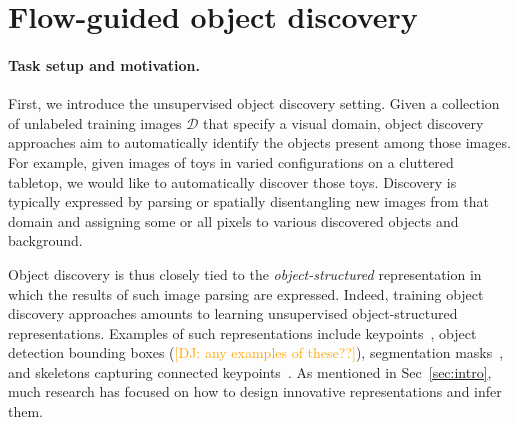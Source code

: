 \documentclass{article}
\newcommand{\jd}[1]{\textcolor{orange}{[DJ: #1]}}
\begin{document}











\section{Flow-guided object discovery}
\label{sec:approach}

\paragraph{Task setup and motivation.} First, we introduce the unsupervised object discovery setting. Given a collection of unlabeled training images $\mathcal{D}$ that specify a visual domain, object discovery approaches aim to automatically identify the objects present among those images. For example, given images of toys in varied configurations on a cluttered tabletop, we would like to automatically discover those toys. Discovery is typically expressed by parsing or spatially disentangling new images from that domain and assigning some or all pixels to various discovered objects and background.

Object discovery is thus closely tied to the \emph{object-structured} representation in which the results of such image parsing are expressed. Indeed, training object discovery approaches amounts to learning unsupervised object-structured representations. Examples of such representations include keypoints~\cite{jakab2018unsupervised, Kulkarni2019UnsupervisedLO}, object detection bounding boxes (\jd{any examples of these??}), segmentation masks~\cite{greff2019multi, kipf2019contrastive}, and skeletons capturing connected keypoints~\cite{jakab2020self}. As mentioned in Sec~\ref{sec:intro}, much research has focused on how to design innovative representations and infer them.
\end{document}
